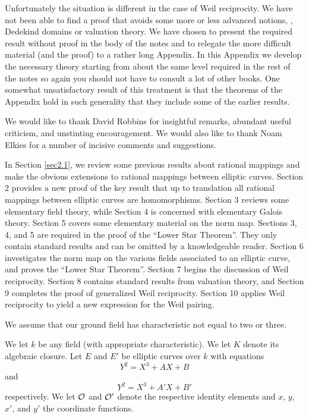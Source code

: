 Unfortunately the situation is different in the case of Weil reciprocity. We have not been able to find a proof that avoids some more or less advanced notions, \ie, Dedekind domains or valuation theory. We have chosen to present the required result without proof in the body of the notes and to relegate the more difficult material (and the proof) to a rather long Appendix. In this Appendix we develop the necessary theory starting from about the same level required in the rest of the notes so again you should not have to consult a lot of other books. One somewhat unsatisfactory result of this treatment is that the theorems of the Appendix hold in such generality that they include some of the earlier results.

We would like to thank David Robbins for insightful remarks, abundant useful criticism, and unstinting encouragement. We would also like to thank Noam Elkies for a number of incisive comments and suggestions.

In Section \ref{sec2.1}, we review some previous results about rational mappings and make the obvious extensions to rational mappings between elliptic curves. Section 2 provides a new proof of the key result that up to translation all rational mappings between elliptic curves are homomorphisms. Section 3 reviews some elementary field theory, while Section 4 is concerned with elementary Galois theory. Section 5 covers some elementary material on the norm map. Sections 3, 4, and 5 are required in the proof of the ``Lower Star Theorem''. They only contain standard results and can be omitted by a knowledgeable reader. Section 6 investigates the norm map on the various fields associated to an elliptic curve, and proves the ``Lower Star Theorem''. Section 7 begins the discussion of Weil reciprocity. Section 8 contains standard results from valuation theory, and Section 9 completes the proof of generalized Weil reciprocity. Section 10 applies Weil reciprocity to yield a new expression for the Weil pairing.

We assume that our ground field has characteristic not equal to two or three.

\iftoggle{ebook}{%
\section{Rational Maps Between Elliptic\\ Curves}
}{%
\section{Rational Maps Between Elliptic Curves}
}
\label{sec2.1}
We let $k$ be any field (with appropriate characteristic). We let $K$ denote its algebraic closure. Let $E$ and $E'$ be elliptic curves over $k$ with equations
$$
Y^{2}=X^{3}+AX+B
$$
and
$$
Y^{2}=X^{3}+A'X+B'
$$
respectively. We let $\mathcal{O}$ and $\mathcal{O}'$ denote the respective identity elements and $x$, $y$, $x'$, and $y'$ the coordinate functions.

